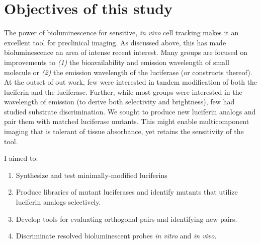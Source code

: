 \section{Objectives of this study}
The power of bioluminescence for sensitive, \textit{in vivo} cell tracking makes it an excellent tool for preclinical imaging. As discussed above, this has made bioluminescence an area of intense recent interest. Many groups are focused on improvements to \textit{(1)} the bioavailability and emission wavelength of small molecule or \textit{(2)} the emission wavelength of the luciferase (or constructs thereof).
At the outset of out work, few were interested in tandem modification of both the luciferin and the luciferase.
Further, while most groups were interested in the wavelength of emission (to derive both selectivity and brightness), few had studied substrate discrimination.
We sought to produce new luciferin analogs and pair them with matched luciferase mutants.
This might enable multicomponent imaging that is tolerant of tissue absorbance, yet retains the sensitivity of the tool.

I aimed to:
\begin{enumerate}
  \item Synthesize and test minimally-modified luciferins
  \item Produce libraries of mutant luciferases and identify mutants that utilize luciferin analogs selectively.
  \item Develop tools for evaluating orthogonal pairs and identifying new pairs.
  \item Discriminate resolved bioluminescent probes \textit{in vitro} and \textit{in vivo}.
\end{enumerate}






